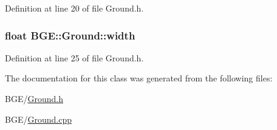 Definition at line 20 of file Ground.\-h.

\hypertarget{class_b_g_e_1_1_ground_a20e9434f0de2737957c4ab23377942e0}{
\subsubsection[{width}]{\setlength{\rightskip}{0pt plus 5cm}float B\-G\-E\-::\-Ground\-::width}}\label{class_b_g_e_1_1_ground_a20e9434f0de2737957c4ab23377942e0}


Definition at line 25 of file Ground.\-h.



The documentation for this class was generated from the following files\-:\begin{DoxyCompactItemize}
\item 
B\-G\-E/\hyperlink{_ground_8h}{Ground.\-h}\item 
B\-G\-E/\hyperlink{_ground_8cpp}{Ground.\-cpp}\end{DoxyCompactItemize}
